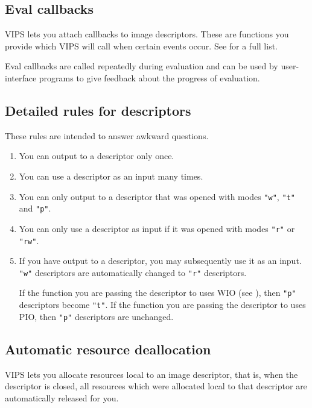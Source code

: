 \subsection{Eval callbacks}
\label{sec:eval}

VIPS lets you attach callbacks to image descriptors. These are functions
you provide which VIPS will call when certain events occur. See
 for a full list.

Eval callbacks are called repeatedly during evaluation and can be used by
user-interface programs to give feedback about the progress of evaluation.

\subsection{Detailed rules for descriptors}

These rules are intended to answer awkward questions. 

\begin{enumerate}

\item
You can output to a descriptor only once.

\item
You can use a descriptor as an input many times.

\item
You can only output to a descriptor that was opened with modes \verb+"w"+,
\verb+"t"+ and \verb+"p"+.

\item
You can only use a descriptor as input if it was opened with modes \verb+"r"+
or \verb+"rw"+.

\item
If you have output to a descriptor, you may subsequently use it as an
input. \verb+"w"+ descriptors are automatically changed to \verb+"r"+
descriptors. 

If the function you are passing the descriptor to uses WIO (see
), then \verb+"p"+ descriptors become \verb+"t"+.
If the function you are passing the descriptor to uses PIO, then \verb+"p"+
descriptors are unchanged.

\end{enumerate}

\subsection{Automatic resource deallocation}

VIPS lets you allocate resources local to an image descriptor, that is,
when the descriptor is closed, all resources which were allocated local to
that descriptor are automatically released for you.

